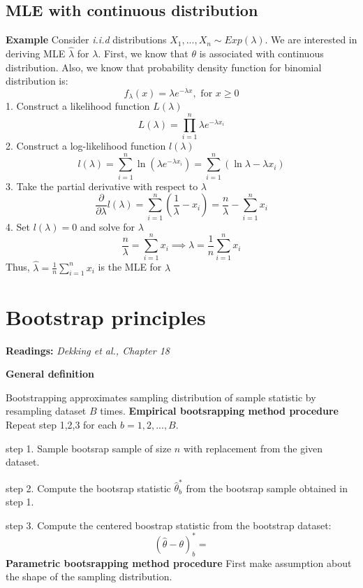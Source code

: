 \documentclass[a4paper]{article}
\begin{document}
\subsection{MLE with continuous distribution}
\begin{mdframed}
    \textbf{Example}
    \newline
    Consider \textit{i.i.d} distributions $X_1, ...,X_n \sim Exp(\lambda)$. We are interested in deriving MLE $\hat{\lambda}$ for $\lambda$.
    First, we know that $\theta$ is associated with continuous distribution. Also, we know that probability density function for binomial distribution is:
    $$f_{\lambda}(x)=\lambda e^{-\lambda x}, \text{ for } x \ge 0$$
    1. Construct a likelihood function $L(\lambda)$
    $$L(\lambda) = \prod_{i=1}^{n}\lambda e^{-\lambda x_i}$$
    2. Construct a log-likelihood function $l(\lambda)$
    $$l(\lambda) = \sum_{i=1}^{n}\ln(\lambda e^{-\lambda x_i})=\sum_{i=1}^{n}(\ln{\lambda}-\lambda x_i)$$
    3. Take the partial derivative with respect to $\lambda$
    $$\frac{\partial}{\partial\lambda}l(\lambda) = \sum_{i=1}^{n}(\frac{1}{\lambda}-x_i)=\frac{n}{\lambda}-\sum_{i=1}^{n}x_i$$
    4. Set $l(\lambda) = 0$ and solve for $\lambda$
    $$\frac{n}{\lambda} = \sum_{i=1}^{n}x_i \implies \lambda = \frac{1}{n}\sum_{i=1}^{n}x_i$$
    Thus, $\hat{\lambda} = \frac{1}{n}\sum_{i=1}^{n}x_i$ is the MLE for $\lambda$

\end{mdframed}


\newpage
\section{Bootstrap principles}
\textbf{Readings:} \textit{Dekking et al., Chapter 18}
\begin{mdframed}[style=Summary]
    \textbf{General definition}
    
        Bootstrapping approximates sampling distribution of sample statistic by resampling dataset $B$ times.
    \newline
    \textbf{Empirical bootsrapping method procedure}
    \newline
    Repeat step 1,2,3 for each $b=1,2,...,B$. 

    step 1. Sample bootsrap sample of size $n$ with replacement from the given dataset.

    step 2. Compute the bootsrap statistic $\hat{\theta}^{*}_b$ from the bootsrap sample obtained in step 1.

    step 3. Compute the centered boostrap statistic from the bootstrap dataset:
    $$(\hat{\theta}-\theta)^{*}_b = $$
    \newline
    \textbf{Parametric bootsrapping method procedure}
    First make assumption about the shape of the sampling distribution.


\end{mdframed}
\end{document}
